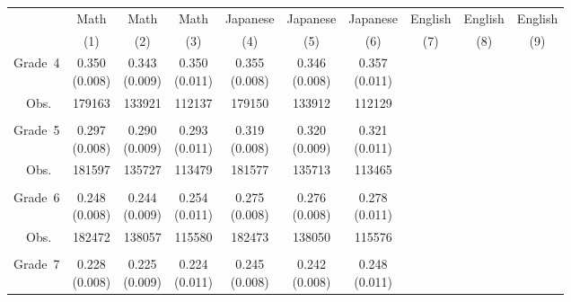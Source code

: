 \begin{tabular}{lccccccccc}
\hline \hline
 & Math & Math & Math & Japanese & Japanese & Japanese & English & English & English \\
 & (1) & (2) & (3) & (4) & (5) & (6) & (7) & (8) & (9) \\
\hline
Grade~4 & \makecell[tc]{0.350\\(0.008)} & \makecell[tc]{0.343\\(0.009)} & \makecell[tc]{0.350\\(0.011)} & \makecell[tc]{0.355\\(0.008)} & \makecell[tc]{0.346\\(0.008)} & \makecell[tc]{0.357\\(0.011)} &  &  &  \\
~~Obs. & 179163 & 133921 & 112137 & 179150 & 133912 & 112129 &  &  &  \\
\\
Grade~5 & \makecell[tc]{0.297\\(0.008)} & \makecell[tc]{0.290\\(0.009)} & \makecell[tc]{0.293\\(0.011)} & \makecell[tc]{0.319\\(0.008)} & \makecell[tc]{0.320\\(0.009)} & \makecell[tc]{0.321\\(0.011)} &  &  &  \\
~~Obs. & 181597 & 135727 & 113479 & 181577 & 135713 & 113465 &  &  &  \\
\\
Grade~6 & \makecell[tc]{0.248\\(0.008)} & \makecell[tc]{0.244\\(0.009)} & \makecell[tc]{0.254\\(0.011)} & \makecell[tc]{0.275\\(0.008)} & \makecell[tc]{0.276\\(0.008)} & \makecell[tc]{0.278\\(0.011)} &  &  &  \\
~~Obs. & 182472 & 138057 & 115580 & 182473 & 138050 & 115576 &  &  &  \\
\\
Grade~7 & \makecell[tc]{0.228\\(0.008)} & \makecell[tc]{0.225\\(0.009)} & \makecell[tc]{0.224\\(0.011)} & \makecell[tc]{0.245\\(0.008)} & \makecell[tc]{0.242\\(0.008)} & \makecell[tc]{0.248\\(0.011)} &  &  &  \\

\end{tabular}
